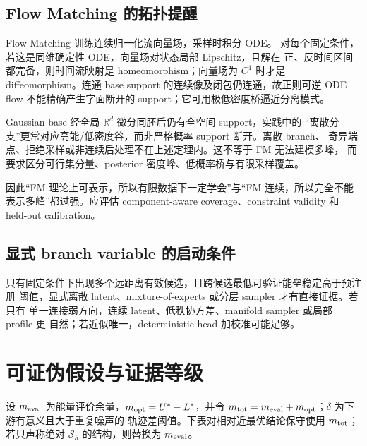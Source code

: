 \documentclass[UTF8,a4paper,11pt]{ctexart}
\newcommand{\Sset}{\mathcal S}
\begin{document}
\subsection{Flow Matching 的拓扑提醒}

Flow Matching 训练连续归一化流向量场，采样时积分 ODE\citep{lipman2023flow}。
对每个固定条件，若这是同维确定性 ODE，向量场对状态局部 Lipschitz，且解在
正、反时间区间都完备，则时间流映射是 homeomorphism；向量场为 $C^1$ 时才是
diffeomorphism。连通 base support 的连续像及闭包仍连通，故正则可逆 ODE flow
不能精确产生字面断开的 support；它可用极低密度桥逼近分离模式。

Gaussian base 经全局 $\mathbb R^d$ 微分同胚后仍有全空间 support，实践中的
“离散分支”更常对应高能/低密度谷，而非严格概率 support 断开。离散 branch、
奇异端点、拒绝采样或非连续后处理不在上述定理内。这不等于 FM 无法建模多峰，
而要求区分可行集分量、posterior 密度峰、低概率桥与有限采样覆盖。

因此“FM 理论上可表示，所以有限数据下一定学会”与“FM 连续，所以完全不能
表示多峰”都过强。应评估 component-aware coverage、constraint validity 和
held-out calibration。

\subsection{显式 branch variable 的启动条件}

只有固定条件下出现多个远距离有效候选，且跨候选最低可验证能垒稳定高于预注册
阈值，显式离散 latent、mixture-of-experts 或分层 sampler 才有直接证据。若只有
单一连接弱方向，连续 latent、低秩协方差、manifold sampler 或局部 profile 更
自然；若近似唯一，deterministic head 加校准可能足够。

\section{可证伪假设与证据等级}

设 $m_{\rm eval}$ 为能量评价余量，$m_{\rm opt}=U^*-L^*$，并令
$m_{\rm tot}=m_{\rm eval}+m_{\rm opt}$；$\delta$ 为下游有意义且大于重复噪声的
轨迹差阈值。下表对相对近最优结论保守使用 $m_{\rm tot}$；若只声称绝对
$\Sset_h$ 的结构，则替换为 $m_{\rm eval}$。
\end{document}
